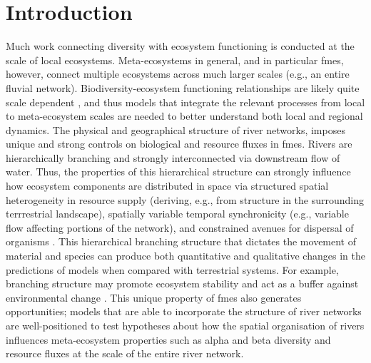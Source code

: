\section{Introduction}

\begin{itemize}
		{Much work connecting diversity with ecosystem functioning is conducted at the scale of local ecosystems.
		Meta-ecosystems in general, and in particular \acp{fme}, however, connect multiple ecosystems across much larger scales (e.g., an entire fluvial network).
		Biodiversity-ecosystem functioning relationships are likely quite scale dependent \autocite{Gonzalez2020}, and thus models that integrate the relevant processes from local to meta-ecosystem scales are needed to better understand both local and regional dynamics.}
		{The physical and geographical structure of river networks, imposes unique and strong controls on biological and resource fluxes in \acp{fme}.
		Rivers are hierarchically branching and strongly interconnected via downstream flow of water.
		Thus, the properties of this hierarchical structure can strongly influence how ecosystem components are distributed in space via structured spatial heterogeneity in resource supply (deriving, e.g., from structure in the surrounding terrrestrial landscape), spatially variable temporal synchronicity (e.g., variable flow affecting portions of the network), and constrained avenues for dispersal of organisms \autocite{Helton2018,BENDA2004,Heino2015}.
		This hierarchical branching structure that dictates the movement of material and species can produce both quantitative and qualitative changes in the predictions of models when compared with terrestrial systems. 
		For example, branching structure may promote ecosystem stability and act as a buffer against environmental change \autocite{Terui2018}.
		This unique property of \acp{fme} also generates opportunities; models that are able to incorporate the structure of river networks are well-positioned to test hypotheses about how the spatial organisation of rivers influences meta-ecosystem properties such as alpha and beta diversity and resource fluxes at the scale of the entire river network.}


\end{itemize}
